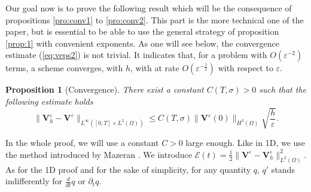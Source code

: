 \documentclass[a4paper,french,english,10pt]{article}
\newcommand\eps{\varepsilon}
\newcommand\V{\mathbf{V}}
\newtheorem{proposition}[theorem]{Proposition}
\begin{document}
Our goal now is to prove the following result 
which will be the consequence
of propositions \ref{pro:conv1} to \ref{pro:conv2}.
This part is the more technical one of the paper, but is essential
to be able to use the general strategy of proposition
\ref{prop:1} with convenient exponents. 
As one will see below, the convergence estimate
(\ref{eq:veps2}) is not trivial. It indicates that, 
for a problem with $O(\varepsilon^{-2})$ terms, a scheme 
converges, with $h$, with  at rate $O(\varepsilon^{-\frac12})$ with respect to
$\eps$.

\begin{proposition}[Convergence]\label{ein_prosit}
There exist a constant $C(T, \sigma)>0$ 
      such that the following estimate holds
\begin{equation} \label{eq:veps2}
\|\V^{\eps}_h-\V^{\eps}\|_{L^\infty( [0,T]\times L^2  (\Omega) )}\leq
C(T, \sigma)\|  \mathbf V ^\eps (0) \|_  { H^3(\Omega)  }
\sqrt{\frac h \eps}.
\end{equation}
\end{proposition}
In the whole proof, we will use a constant $C>0$ large enough.
 Like in 1D, we use the method introduced by Mazeran \cite{Mazeran}. 
We introduce
$\mathscr{E}(t)=\frac12 \|\V^{\eps}-\V^{\eps}_h\|_{L^2(\Omega)}^2$.
As for the 1D proof and for the sake of simplicity, for any quantity $q$,   $q'$ stands indifferently for  $\frac{d}{dt}q $ or $\partial_t q $.
\end{document}
